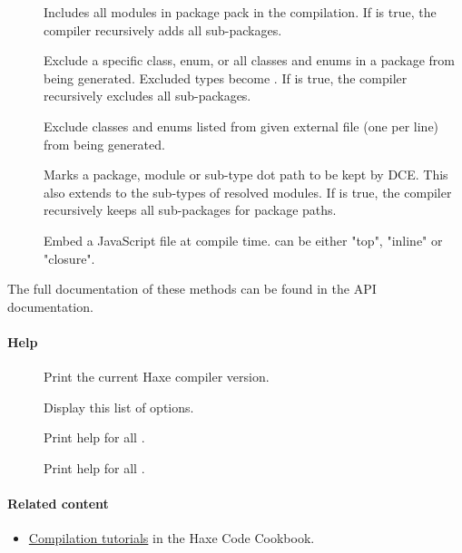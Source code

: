 \begin{description}
	\item[] 
		Includes all modules in package pack in the compilation.  If  is true, the compiler recursively adds all sub-packages.
	\item[] 
		Exclude a specific class, enum, or all classes and enums in a package from being generated. Excluded types become . If  is true, the compiler recursively excludes all sub-packages.
	\item[] 
		Exclude classes and enums listed from given external file (one per line) from being generated.
	\item[] 
		Marks a package, module or sub-type dot path to be kept by DCE. This also extends to the sub-types of resolved modules. If  is true, the compiler recursively keeps all sub-packages for package paths.
	\item[] 
		Embed a JavaScript file at compile time.  can be either "top", "inline" or "closure". 
\end{description}

The full documentation of these methods can be found in the \href{http://api.haxe.org/haxe/macro/Compiler.html}{} API documentation.

\paragraph{Help}

\begin{description}
	\item[] Print the current Haxe compiler version.
	\item[] Display this list of options.
	\item[] Print help for all .
	\item[] Print help for all .
\end{description}

\paragraph{Related content}
\begin{itemize}
	\item \href{http://code.haxe.org/category/compilation/}{Compilation tutorials} in the Haxe Code Cookbook.
\end{itemize}


